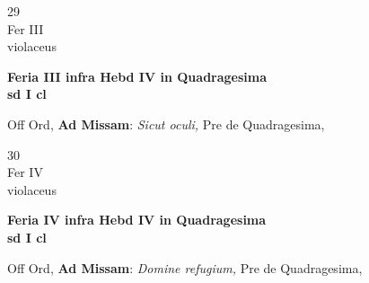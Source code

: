 \documentclass[10pt, openany]{book}
\begin{document}
        \begin{center}
            \begin{minipage}{3.5in}
                \vspace{2em}
                \begin{minipage}{0.5in}
                    {\Huge 29} \\
                    {\normalsize Fer III} \\
                    {\normalsize violaceus}
                \end{minipage}
                \begin{minipage}{3.0in}
                    \textbf{ \large Feria III infra Hebd IV in Quadragesima  \\
                    \textnormal{\normalsize sd I cl}} \\ 
                \end{minipage}
                \begin{justify}Off Ord, \textbf{Ad Missam}: \textit{Sicut oculi,} Pre de Quadragesima,   
                \end{justify}
            \end{minipage}
        \end{center}
    
        \begin{center}
            \begin{minipage}{3.5in}
                \vspace{2em}
                \begin{minipage}{0.5in}
                    {\Huge 30} \\
                    {\normalsize Fer IV} \\
                    {\normalsize violaceus}
                \end{minipage}
                \begin{minipage}{3.0in}
                    \textbf{ \large Feria IV infra Hebd IV in Quadragesima  \\
                    \textnormal{\normalsize sd I cl}} \\ 
                \end{minipage}
                \begin{justify}Off Ord, \textbf{Ad Missam}: \textit{Domine refugium,} Pre de Quadragesima,   
                \end{justify}
            \end{minipage}
        \end{center}
    
\end{document}
